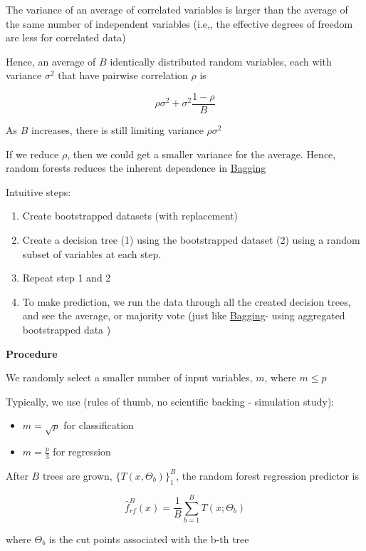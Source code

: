 \documentclass[
]{book}
\providecommand{\tightlist}{%
  \setlength{\itemsep}{0pt}\setlength{\parskip}{0pt}}
\begin{document}
The variance of an average of correlated variables is larger than the average of the same number of independent variables (i.e,, the effective degrees of freedom are less for correlated data)

Hence, an average of \(B\) identically distributed random variables, each with variance \(\sigma^2\) that have pairwise correlation \(\rho\) is

\[
\rho \sigma^2 + \sigma^2 \frac{1 - \rho}{B}
\]

As \(B\) increases, there is still limiting variance \(\rho \sigma^2\)

If we reduce \(\rho\), then we could get a smaller variance for the average. Hence, random forests reduces the inherent dependence in \protect\hyperlink{bagging}{Bagging}

Intuitive steps:

\begin{enumerate}
\def\labelenumi{\arabic{enumi}.}
\tightlist
\item
  Create bootstrapped datasets (with replacement)
\item
  Create a decision tree (1) using the bootstrapped dataset (2) using a random subset of variables at each step.
\item
  Repeat step 1 and 2
\item
  To make prediction, we run the data through all the created decision trees, and see the average, or majority vote (just like \protect\hyperlink{bagging}{Bagging}- using aggregated bootstrapped data )
\end{enumerate}

\textbf{Procedure}

We randomly select a smaller number of input variables, \(m\), where \(m \le p\)

Typically, we use (rules of thumb, no scientific backing - simulation study):

\begin{itemize}
\item
  \(m = \sqrt{p}\) for classification
\item
  \(m = \frac{p}{3}\) for regression
\end{itemize}

After \(B\) trees are grown, \(\{T(x, \Theta_b)\}^B_1\), the random forest regression predictor is

\[
\hat{f}^B_{rf} (x) = \frac{1}{B} \sum_{b=1}^B T(x; \Theta_b)
\]

where \(\Theta_b\) is the cut points associated with the b-th tree
\end{document}
